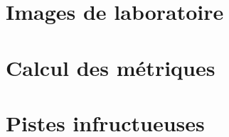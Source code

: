 \documentclass[a4paper]{article}
\begin{document}
\newpage
\printbibliography

\begin{appendices}

\section{Images de laboratoire}
\label{sec: annexe}


\section{Calcul des métriques}


\section{Pistes infructueuses}
\label{sec: pistes infructruces}



\end{appendices}
\end{document}

